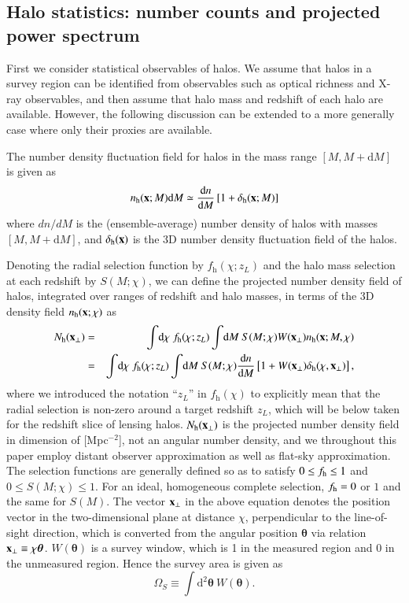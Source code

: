 \documentclass[onecolumn,notitlepage,showpacs,amsmath,amssymb,prd,floatfix]{revtex4-1}
\newcommand{\bx}{{\bf x}}
\newcommand{\btheta}{{\bm{\theta}}}
\newcommand{\dr}{\mathrm{d}}
\newcommand{\deltah}{\delta_{\mathrm{h}}}
\newcommand{\bh}{\mathrm{h}}
\newcommand{\bnh}{\frac{\dr n}{\dr M}}
\begin{document}
\subsection{Halo statistics: number counts and projected power spectrum}

First we consider statistical observables of halos. We assume that halos
in a survey region can be identified from observables such as optical
richness and X-ray observables, and then assume that halo mass and
redshift of each halo are available. However, the following discussion
can be extended to a more generally case where only their proxies
are available.

The number density fluctuation field for halos in the mass range
$[M,M+\dr M]$ is given as
%
\begin{equation}
 n_\bh(\bx; M)\dr M\simeq
  \frac{\dr n}{\dr M}
  \left[1+\deltah(\bx; M)\right]
\end{equation}
%
where
$dn/dM$ is the (ensemble-average) number density of halos with masses
 $[M,M+\dr M]$, and $\deltah(\bx)$ is the 3D number density fluctuation
 field of the halos.


Denoting the radial selection function by $f_\bh(\chi;z_L)$ and the halo
mass selection at each redshift by $S(M;\chi)$, we can define the
projected number density field of halos, integrated over ranges of
redshift and halo masses, in terms of the 3D density field $n_{\rm
h}(\bx;\chi)$ as
%
\begin{eqnarray}
 N_{\rm h}(\bx_\perp)&=&\int\!\dr\chi~f_\bh(\chi;z_L)\int\!\dr M~S(M;\chi)W(\bx_\perp)
  n_\bh(\bx;M,\chi)\nonumber\\
 &=&\int\!\dr\chi~f_\bh(\chi;z_L)\int\!\dr M~S(M;\chi)\frac{\dr n}{\dr M}
  \left[1+W(\bx_\perp)\deltah(\chi,\bx_\perp)\right],
  \label{eq:Nh}
\end{eqnarray}
%
where we introduced the notation ``$z_L$'' in $f_\bh(\chi)$ to
explicitly mean that the radial selection is non-zero around a target
redshift $z_L$, which will be below taken for the redshift slice of
lensing halos.  $N_{\rm h}(\bx_\perp)$ is the projected number density
field in dimension of [Mpc$^{-2}$], not an angular number density, and
we throughout this paper employ distant observer approximation as well
as flat-sky approximation.  The selection functions are generally
defined so as to satisfy $0\le f_{\rm h}\le 1$ and $0\le S(M;\chi)\le
1$. For an ideal, homogeneous complete selection, $f_{\rm h}=0$ or $1$
and the same for $S(M)$.  The vector $\bx_\perp$ in the above equation
denotes the position vector in the two-dimensional plane at distance
$\chi$, perpendicular to the line-of-sight direction, which is converted
from the angular position $\btheta$ via relation $\bx_\perp\equiv
\chi\btheta$. $W(\btheta)$ is a survey window, which is 1 in the
measured region and 0 in the unmeasured region. Hence the survey area is
given as
%
\begin{equation}
 \Omega_S\equiv \int\!\dr^2\btheta~W(\btheta).
\end{equation}
%
\end{document}
